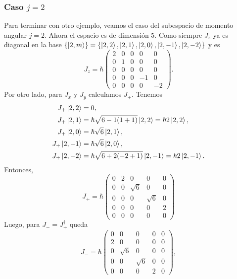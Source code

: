 \documentclass[10pt, a4paper]{article}
\numberwithin{equation}{subsection}
\begin{document}
\subsubsection{Caso $j = 2$}

Para terminar con otro ejemplo, veamos el caso del subespacio de momento
angular $j = 2$. Ahora el espacio es de dimensión 5. Como siempre $J_z$ ya es
diagonal en la base $\set{\ket{2,m}} = \set{\ket{2,2}, \ket{2,1}, \ket{2,0},
\ket{2,-1}, \ket{2,-2}}$ y es
\begin{equation}
  J_z = \hbar\begin{pmatrix}
    2 & 0 & 0 & 0 & 0 \\
    0 & 1 & 0 & 0 & 0 \\
    0 & 0 & 0 & 0 & 0 \\
    0 & 0 & 0 & -1 & 0 \\
    0 & 0 & 0 & 0 & -2
  \end{pmatrix}.
\end{equation}
Por otro lado, para $J_x$ y $J_y$ calculamos $J_+$. Tenemos
\begin{align}
  J_+\ket{2,2} &= 0, \\
  J_+\ket{2,1} &= \hbar\sqrt{6 -1(1+1)}\ket{2,2} = \hbar2\ket{2,2}, \\
  J_+\ket{2,0} &= \hbar\sqrt{6}\ket{2,1}, \\
  J_+\ket{2,-1} &= \hbar\sqrt{6}\ket{2,0}, \\
  J_+\ket{2,-2} &= \hbar\sqrt{6 + 2(-2 + 1)}\ket{2,-1} = \hbar2\ket{2,-1}.
\end{align}
Entonces,
\begin{equation}
  J_+ = \hbar \begin{pmatrix}
    0 & 2 & 0 & 0 & 0 \\
    0 & 0 & \sqrt{6} & 0 & 0 \\
    0 & 0 & 0 & \sqrt{6} & 0 \\
    0 & 0 & 0 & 0 & 2 \\
    0 & 0 & 0 & 0 & 0
  \end{pmatrix}
\end{equation}
Luego, para $J_- = J_+^\dagger$ queda
\begin{equation}
  J_- = \hbar \begin{pmatrix}
    0 & 0 & 0 & 0 & 0 \\
    2 & 0 & 0 & 0 & 0 \\
    0 & \sqrt{6} & 0 & 0 & 0 \\
    0 & 0 & \sqrt{6} & 0 & 0 \\
    0 & 0 & 0 & 2 & 0
  \end{pmatrix},
\end{equation}
\end{document}
